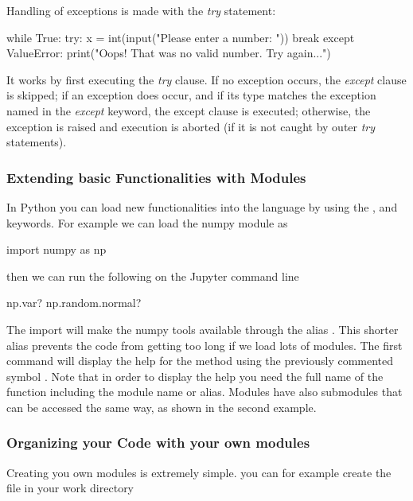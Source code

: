 \noindent Handling of exceptions is made with the \textit{try} statement:

\begin{python}
while True:
    try:
        x = int(input("Please enter a number: "))
        break
    except ValueError:
        print("Oops! That was no valid number. Try again...")
\end{python}

It works by first executing the \textit{try} clause. If no exception occurs, the \textit{except} clause is skipped; if an exception does occur, and if its type matches the exception named in the \textit{except} keyword, the except clause is executed; otherwise, the exception is raised and execution is aborted (if it is not caught by outer \textit{try} statements).


\subsubsection{Extending basic Functionalities with Modules}

In Python you can load new functionalities into the language by using the
,  and  keywords. For example we can load the
numpy module as

\begin{python}
import numpy as np
\end{python}

\noindent then we can run the following on the Jupyter command line

\begin{python}
np.var?
np.random.normal?
\end{python}

The import will make the numpy tools available through the alias .  This shorter alias prevents the code from getting too long if we load lots of modules. The first command will display the help for the method  using the previously commented symbol . Note that in order to display the help you need the full name of the function including the module name or alias. Modules have also submodules that can be accessed the same way, as shown in the second example.

\subsubsection{Organizing your Code with your own modules}

Creating you own modules is extremely simple. you can for example create the
file in your work directory

